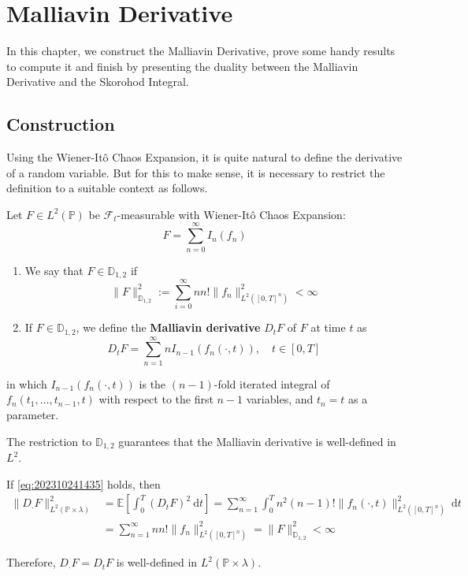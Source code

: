 \chapter{Malliavin Derivative} 

In this chapter, we construct the Malliavin Derivative, prove some handy results to compute it and finish by presenting the duality between the Malliavin Derivative and the Skorohod Integral.

\section{Construction}

Using the Wiener-Itô Chaos Expansion, it is quite natural to define the derivative of a random variable. But for this to make sense, it is necessary to restrict the definition to a suitable context as follows.

\begin{definition}
Let $F \in L^2(\mathbb{P})$ be $\mathcal{F}_t$-measurable with Wiener-Itô Chaos Expansion:
$$
F = \sum_{n=0}^\infty I_n(f_n)
$$

\begin{enumerate}
\item We say that $F \in \mathbb{D}_{1,2}$ if 
\begin{equation}\label{eq:202310241435} 
\| F \|_{\mathbb{D}_{1,2}}^2 := \sum_{i=0}^\infty n n! \| f_n \|_{L^2([0,T]^n)}^2 < \infty
\end{equation}

\item If $F \in \mathbb{D}_{1,2}$, we define the \textbf{Malliavin derivative} $D_t F$ of $F$ at time $t$ as 
\begin{equation}\label{eq:202310241436}
D_t F = \sum_{n=1}^\infty n I_{n-1}(f_n(\cdot, t)), \quad t \in [0,T]
\end{equation} 
\end{enumerate}
in which $I_{n-1}(f_n(\cdot, t))$ is the $(n-1)$-fold iterated integral of $f_n(t_1, \ldots, t_{n-1}, t)$ with respect to the first $n-1$ variables, and $t_n = t$ as a parameter. 
\end{definition}

The restriction to $\mathbb{D}_{1,2}$ guarantees that the Malliavin derivative is well-defined in $L^2$.

\begin{remark}
If \eqref{eq:202310241435} holds, then 
\begin{equation*}
	\begin{aligned}
		\| D_\cdot F \|_{L^2(\mathbb{P} \times \lambda)}^2 &= \mathbb{E} \left[ \int_0^T (D_t F)^2 ~\mathrm{d}t \right] = \sum_{n=1}^\infty \int_0^T n^2 (n-1)! \| f_n(\cdot, t) \|_{L^2([0,T]^n)}^2 ~\mathrm{d}t \\
		&= \sum_{n=1}^\infty n n! \| f_n \|_{L^2([0,T]^n)}^2 = \| F \|_{\mathbb{D}_{1,2}}^2 < \infty
	\end{aligned}
\end{equation*} 

Therefore, $D_\cdot F = D_t F$ is well-defined in $L^2(\mathbb{P} \times \lambda)$.
\end{remark}

